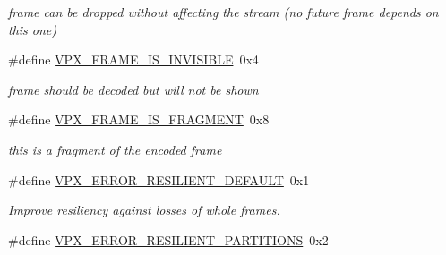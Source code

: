 \begin{DoxyCompactItemize}
\begin{DoxyCompactList}\small\item\em frame can be dropped without affecting the stream (no future frame depends on this one) \end{DoxyCompactList}\item 
\#define \hyperlink{group__encoder_ga060d7e881d249bdb6e1a29b42e559685}{V\+P\+X\+\_\+\+F\+R\+A\+M\+E\+\_\+\+I\+S\+\_\+\+I\+N\+V\+I\+S\+I\+B\+LE}~0x4\hypertarget{group__encoder_ga060d7e881d249bdb6e1a29b42e559685}{}\label{group__encoder_ga060d7e881d249bdb6e1a29b42e559685}

\begin{DoxyCompactList}\small\item\em frame should be decoded but will not be shown \end{DoxyCompactList}\item 
\#define \hyperlink{group__encoder_gafb9f7dbf9b8a764c521d8b12c0e6959d}{V\+P\+X\+\_\+\+F\+R\+A\+M\+E\+\_\+\+I\+S\+\_\+\+F\+R\+A\+G\+M\+E\+NT}~0x8\hypertarget{group__encoder_gafb9f7dbf9b8a764c521d8b12c0e6959d}{}\label{group__encoder_gafb9f7dbf9b8a764c521d8b12c0e6959d}

\begin{DoxyCompactList}\small\item\em this is a fragment of the encoded frame \end{DoxyCompactList}\item 
\#define \hyperlink{group__encoder_ga651e80c00662995ac9151bb7433db3e5}{V\+P\+X\+\_\+\+E\+R\+R\+O\+R\+\_\+\+R\+E\+S\+I\+L\+I\+E\+N\+T\+\_\+\+D\+E\+F\+A\+U\+LT}~0x1\hypertarget{group__encoder_ga651e80c00662995ac9151bb7433db3e5}{}\label{group__encoder_ga651e80c00662995ac9151bb7433db3e5}

\begin{DoxyCompactList}\small\item\em Improve resiliency against losses of whole frames. \end{DoxyCompactList}\item 
\#define \hyperlink{group__encoder_gac9b4ca99f12504d951589fac6854fc09}{V\+P\+X\+\_\+\+E\+R\+R\+O\+R\+\_\+\+R\+E\+S\+I\+L\+I\+E\+N\+T\+\_\+\+P\+A\+R\+T\+I\+T\+I\+O\+NS}~0x2\hypertarget{group__encoder_gac9b4ca99f12504d951589fac6854fc09}{}\label{group__encoder_gac9b4ca99f12504d951589fac6854fc09}


\end{DoxyCompactItemize}
